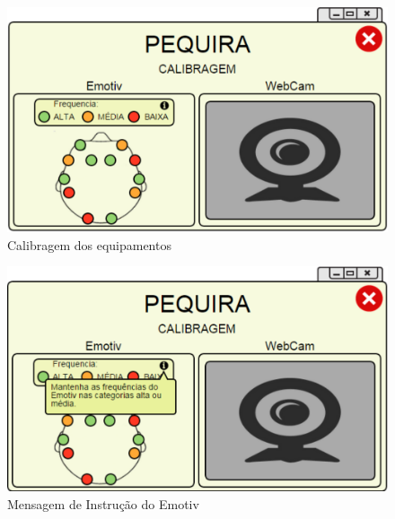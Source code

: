 \documentclass[12pt]{article}
\begin{document}
\begin{figure}[h]
\centering
\includegraphics[scale=0.4]{imagens2/1-1Calibragem.pdf}
\caption{Calibragem dos equipamentos}
\label{calibragem}
\end{figure}

\begin{figure}[h]
\centering
\includegraphics[scale=0.4]{imagens2/1-1-2Mensagemdeinstrucao.pdf}
\caption{Mensagem de Instrução do Emotiv}
\label{instrucao_emotiv}
\end{figure}
\end{document}
